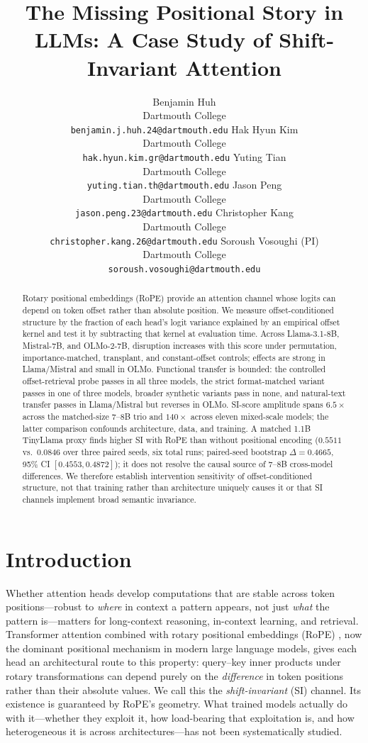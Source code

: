 \documentclass{article}
\title{The Missing Positional Story in LLMs: A Case Study of Shift-Invariant Attention}
\author{%
  Benjamin Huh \\
  Dartmouth College \\
  \texttt{benjamin.j.huh.24@dartmouth.edu}
  \And
  Hak Hyun Kim \\
  Dartmouth College \\
  \texttt{hak.hyun.kim.gr@dartmouth.edu}
  \And
  Yuting Tian \\
  Dartmouth College \\
  \texttt{yuting.tian.th@dartmouth.edu}
  \And
  Jason Peng \\
  Dartmouth College \\
  \texttt{jason.peng.23@dartmouth.edu}
  \And
  Christopher Kang \\
  Dartmouth College \\
  \texttt{christopher.kang.26@dartmouth.edu}
  \AND
  Soroush Vosoughi (PI) \\
  Dartmouth College \\
  \texttt{soroush.vosoughi@dartmouth.edu}
}
\begin{document}
\maketitle

\begin{abstract}
Rotary positional embeddings (RoPE) provide an attention channel whose logits can depend on token offset rather than absolute position. We measure offset-conditioned structure by the fraction of each head's logit variance explained by an empirical offset kernel and test it by subtracting that kernel at evaluation time. Across Llama-3.1-8B, Mistral-7B, and OLMo-2-7B, disruption increases with this score under permutation, importance-matched, transplant, and constant-offset controls; effects are strong in Llama/Mistral and small in OLMo. Functional transfer is bounded: the controlled offset-retrieval probe passes in all three models, the strict format-matched variant passes in one of three models, broader synthetic variants pass in none, and natural-text transfer passes in Llama/Mistral but reverses in OLMo. SI-score amplitude spans $6.5\times$ across the matched-size 7--8B trio and $140\times$ across eleven mixed-scale models; the latter comparison confounds architecture, data, and training. A matched 1.1B TinyLlama proxy finds higher SI with RoPE than without positional encoding ($0.5511$ vs.\ $0.0846$ over three paired seeds, six total runs; paired-seed bootstrap $\Delta=0.4665$, 95\% CI $[0.4553,0.4872]$); it does not resolve the causal source of 7--8B cross-model differences. We therefore establish intervention sensitivity of offset-conditioned structure, not that training rather than architecture uniquely causes it or that SI channels implement broad semantic invariance.
\end{abstract}

\section{Introduction}
\label{sec:introduction}

Whether attention heads develop computations that are stable across token positions---robust to \emph{where} in context a pattern appears, not just \emph{what} the pattern is---matters for long-context reasoning, in-context learning, and retrieval.
Transformer attention \citep{vaswani2017attention} combined with rotary positional embeddings (RoPE) \citep{su2021roformer}, now the dominant positional mechanism in modern large language models, gives each head an architectural route to this property: query--key inner products under rotary transformations can depend purely on the \emph{difference} in token positions rather than their absolute values.
We call this the \emph{shift-invariant} (SI) channel.
Its existence is guaranteed by RoPE's geometry.
What trained models actually do with it---whether they exploit it, how load-bearing that exploitation is, and how heterogeneous it is across architectures---has not been systematically studied.
\end{document}
